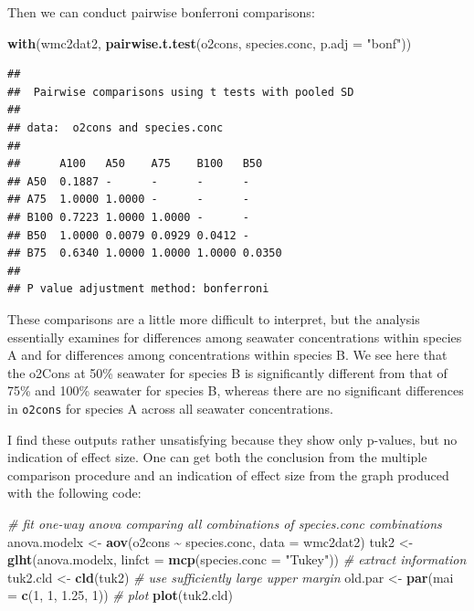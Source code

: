\documentclass[
  12pt,
]{book}
\newenvironment{Shaded}{\begin{snugshade}}{\end{snugshade}}
\newcommand{\CommentTok}[1]{\textcolor[rgb]{0.56,0.35,0.01}{\textit{#1}}}
\newcommand{\DataTypeTok}[1]{\textcolor[rgb]{0.13,0.29,0.53}{#1}}
\newcommand{\DecValTok}[1]{\textcolor[rgb]{0.00,0.00,0.81}{#1}}
\newcommand{\FloatTok}[1]{\textcolor[rgb]{0.00,0.00,0.81}{#1}}
\newcommand{\KeywordTok}[1]{\textcolor[rgb]{0.13,0.29,0.53}{\textbf{#1}}}
\newcommand{\NormalTok}[1]{#1}
\newcommand{\OperatorTok}[1]{\textcolor[rgb]{0.81,0.36,0.00}{\textbf{#1}}}
\newcommand{\StringTok}[1]{\textcolor[rgb]{0.31,0.60,0.02}{#1}}
\begin{document}
Then we can conduct pairwise bonferroni comparisons:

\begin{Shaded}
\begin{Highlighting}[]
\KeywordTok{with}\NormalTok{(wmc2dat2, }\KeywordTok{pairwise.t.test}\NormalTok{(o2cons, species.conc, }\DataTypeTok{p.adj =} \StringTok{"bonf"}\NormalTok{))}
\end{Highlighting}
\end{Shaded}

\begin{verbatim}
## 
##  Pairwise comparisons using t tests with pooled SD 
## 
## data:  o2cons and species.conc 
## 
##      A100   A50    A75    B100   B50   
## A50  0.1887 -      -      -      -     
## A75  1.0000 1.0000 -      -      -     
## B100 0.7223 1.0000 1.0000 -      -     
## B50  1.0000 0.0079 0.0929 0.0412 -     
## B75  0.6340 1.0000 1.0000 1.0000 0.0350
## 
## P value adjustment method: bonferroni
\end{verbatim}

These comparisons are a little more difficult to interpret, but the analysis essentially examines for differences among seawater concentrations within species A and for differences among concentrations within species B. We see here that the o2Cons at 50\% seawater for species B is significantly different from that of 75\% and 100\% seawater for species B, whereas there are no significant differences in \texttt{o2cons} for species A across all seawater concentrations.

I find these outputs rather unsatisfying because they show only p-values, but no indication of effect size. One can get both the conclusion from the multiple comparison procedure and an indication of effect size from the graph produced with the following code:

\begin{Shaded}
\begin{Highlighting}[]
\CommentTok{\# fit one{-}way anova comparing all combinations of species.conc combinations}
\NormalTok{anova.modelx \textless{}{-}}\StringTok{ }\KeywordTok{aov}\NormalTok{(o2cons }\OperatorTok{\textasciitilde{}}\StringTok{ }\NormalTok{species.conc, }\DataTypeTok{data =}\NormalTok{ wmc2dat2)}
\NormalTok{tuk2 \textless{}{-}}\StringTok{ }\KeywordTok{glht}\NormalTok{(anova.modelx, }\DataTypeTok{linfct =} \KeywordTok{mcp}\NormalTok{(}\DataTypeTok{species.conc =} \StringTok{"Tukey"}\NormalTok{))}
\CommentTok{\# extract information}
\NormalTok{tuk2.cld \textless{}{-}}\StringTok{ }\KeywordTok{cld}\NormalTok{(tuk2)}
\CommentTok{\# use sufficiently large upper margin}
\NormalTok{old.par \textless{}{-}}\StringTok{ }\KeywordTok{par}\NormalTok{(}\DataTypeTok{mai =} \KeywordTok{c}\NormalTok{(}\DecValTok{1}\NormalTok{, }\DecValTok{1}\NormalTok{, }\FloatTok{1.25}\NormalTok{, }\DecValTok{1}\NormalTok{))}
\CommentTok{\# plot}
\KeywordTok{plot}\NormalTok{(tuk2.cld)}
\end{Highlighting}
\end{Shaded}
\end{document}

